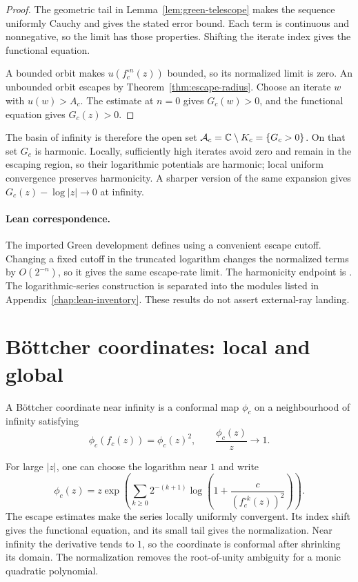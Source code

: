 \begin{proof}
The geometric tail in Lemma~\ref{lem:green-telescope} makes the sequence
uniformly Cauchy and gives the stated error bound.  Each term is
continuous and nonnegative, so the limit has those properties.
Shifting the iterate index gives the functional equation.

A bounded orbit makes $u(f_c^{\circ n}(z))$ bounded, so its normalized
limit is zero.  An unbounded orbit escapes by
Theorem~\ref{thm:escape-radius}.  Choose an iterate $w$ with
$u(w)>A_c$.  The estimate at $n=0$ gives $G_c(w)>0$, and the functional
equation gives $G_c(z)>0$.
\end{proof}

The basin of infinity is therefore the open set
$\mathcal A_c=\mathbb C\setminus K_c=\{G_c>0\}$.
On that set $G_c$ is harmonic.  Locally, sufficiently high iterates
avoid zero and remain in the escaping region, so their logarithmic
potentials are harmonic; local uniform convergence preserves
harmonicity.  A sharper version of the same expansion gives
$G_c(z)-\log|z|\to0$ at infinity.

\paragraph{Lean correspondence.}
The imported Green development defines 
using a convenient escape cutoff.  Changing a fixed cutoff in the
truncated logarithm changes the normalized terms by $O(2^{-n})$,
so it gives the same escape-rate limit.
The harmonicity endpoint is
.
The logarithmic-series construction is separated into the modules
listed in Appendix~\ref{chap:lean-inventory}.  These results do not
assert external-ray landing.

\section{Böttcher coordinates: local and global}

\begin{definition}
A Böttcher coordinate near infinity is a conformal map $\phi_c$ on
a neighbourhood of infinity satisfying
\[
 \phi_c(f_c(z))=\phi_c(z)^2,\qquad
 \frac{\phi_c(z)}z\longrightarrow1.
\]
\end{definition}

For large $|z|$, one can choose the logarithm near $1$ and write
\[
 \phi_c(z)=z\exp\left(
       \sum_{k\ge0}2^{-(k+1)}
       \log\left(1+\frac{c}{(f_c^{\circ k}(z))^2}\right)\right).
\]
The escape estimates make the series locally uniformly convergent.
Its index shift gives the functional equation, and its small tail
gives the normalization.  Near infinity the derivative tends to $1$,
so the coordinate is conformal after shrinking its domain.
The normalization removes the root-of-unity ambiguity for a monic
quadratic polynomial.

